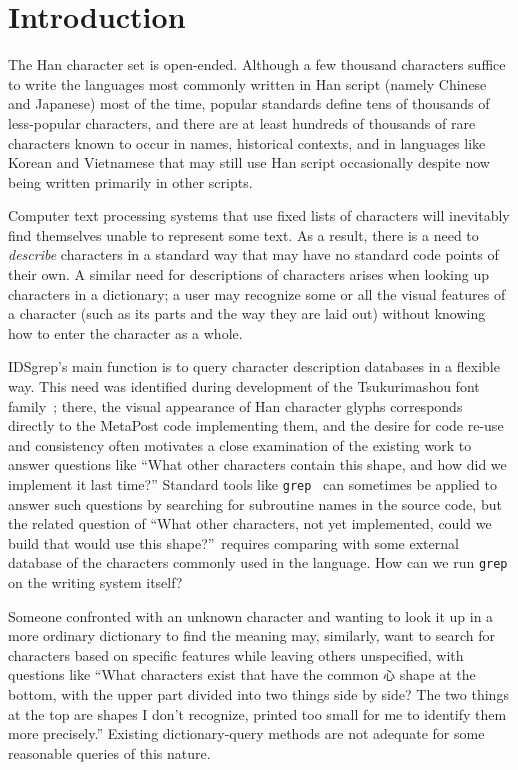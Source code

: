 \documentclass[twocolumn]{report}
\begin{document}
\chapter{Introduction}

\noindent
The Han character set is open-ended.  Although a few thousand characters
suffice to write the languages most commonly written in Han script
(namely Chinese and Japanese) most of the time, popular standards define
tens of thousands of less-popular characters, and there are at least
hundreds of thousands of rare characters known to occur in names, historical
contexts, and in languages like Korean and Vietnamese that may still use Han
script occasionally despite now being written primarily in other scripts.

Computer text processing systems that use fixed lists of characters will
inevitably find themselves unable to represent some text.  As a result,
there is a need to \emph{describe} characters in a standard way that may
have no standard code points of their own.  A similar need for descriptions
of characters arises when looking up characters in a dictionary; a user may
recognize some or all the visual features of a character (such as its parts
and the way they are laid out) without knowing how to enter the character as
a whole.

IDSgrep's main function is to query character description databases in a
flexible way.  This need was identified during development of the
Tsukurimashou font family~\cite{Tsukurimashou}; there, the visual appearance
of Han character glyphs corresponds directly to the MetaPost code
implementing them, and the desire for code re-use and consistency often
motivates a close examination of the existing work to answer questions like
``What other characters contain this shape, and how did we implement it last
time?'' Standard tools like \texttt{grep}~\cite{grep} can sometimes be
applied to answer such questions by searching for subroutine names in the
source code, but the related question of ``What other characters, not yet
implemented, could we build that would use this shape?''\ requires comparing
with some external database of the characters commonly used in the language. 
How can we run \texttt{grep} on the writing system itself?

Someone confronted with an unknown character and wanting to look it up in a
more ordinary dictionary to find the meaning may, similarly, want to search
for characters based on specific features while leaving others unspecified,
with questions like ``What characters exist that have the common \texttt{心}
shape at the bottom, with the upper part divided into two things side by
side?  The two things at the top are shapes I don't recognize, printed too
small for me to identify them more precisely.'' Existing dictionary-query
methods are not adequate for some reasonable queries of this nature.
\end{document}
